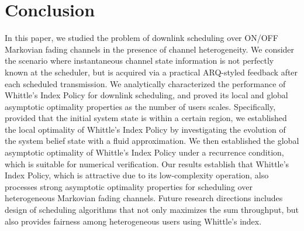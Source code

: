 \documentclass[11pt,twocolumn]{IEEEtran}
\begin{document}
\section{Conclusion}
In this paper, we studied the problem of downlink scheduling over ON/OFF Markovian fading channels in the presence of channel heterogeneity. We consider the scenario where instantaneous channel state information is not perfectly known at the scheduler, but is acquired via a practical ARQ-styled feedback after each scheduled transmission. We analytically characterized the performance of Whittle's Index Policy for downlink scheduling, and proved its local and global asymptotic optimality properties as the number of users scales. Specifically, provided that the initial system state is within a certain region, we established the local optimality of Whittle's Index Policy by investigating the evolution of the system belief state with a fluid approximation. We then established the global asymptotic optimality of Whittle's Index Policy under a recurrence condition, which is suitable for numerical verification. Our results establish that Whittle's Index Policy, which is attractive due to its low-complexity operation, also processes strong asymptotic optimality properties for scheduling over heterogeneous Markovian fading channels. Future research directions includes design of scheduling algorithms that not only maximizes the sum throughput, but also provides fairness among heterogeneous users using Whittle's index.
\vspace{6pt}
\end{document}
